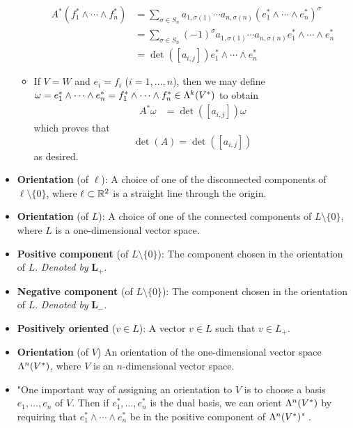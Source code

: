 \documentclass[../notes.tex]{subfiles}
\begin{document}
\begin{itemize}
\begin{itemize}
        \begin{align*}
            A^*(f_1^*\wedge\cdots\wedge f_n^*) &= \sum_{\sigma\in S_n}a_{1,\sigma(1)}\cdots a_{n,\sigma(n)}(e_1^*\wedge\cdots\wedge e_n^*)^\sigma\\
            &= \sum_{\sigma\in S_n}(-1)^\sigma a_{1,\sigma(1)}\cdots a_{n,\sigma(n)}e_1^*\wedge\cdots\wedge e_n^*\\
            &= \det([a_{i,j}])e_1^*\wedge\cdots\wedge e_n^*
        \end{align*}
        \item If $V=W$ and $e_i=f_i$ ($i=1,\dots,n$), then we may define $\omega=e_1^*\wedge\cdots\wedge e_n^*=f_1^*\wedge\cdots\wedge f_n^*\in\lam[k]{V^*}$ to obtain
        \begin{align*}
            A^*\omega &= \det([a_{i,j}])\omega
        \end{align*}
        which proves that
        \begin{equation*}
            \det(A) = \det([a_{i,j}])
        \end{equation*}
        as desired.
    \end{itemize}
    \item \textbf{Orientation} (of $\ell$): A choice of one of the disconnected components of $\ell\setminus\{0\}$, where $\ell\subset\R^2$ is a straight line through the origin.
    \item \textbf{Orientation} (of $L$): A choice of one of the connected components of $L\setminus\{0\}$, where $L$ is a one-dimensional vector space.
    \item \textbf{Positive component} (of $L\setminus\{0\}$): The component chosen in the orientation of $L$. \emph{Denoted by} $\bm{L_+}$.
    \item \textbf{Negative component} (of $L\setminus\{0\}$): The component chosen in the orientation of $L$. \emph{Denoted by} $\bm{L_-}$.
    \item \textbf{Positively oriented} ($v\in L$): A vector $v\in L$ such that $v\in L_+$.
    \item \textbf{Orientation} (of $V$) An orientation of the one-dimensional vector space $\lam[n]{V^*}$, where $V$ is an $n$-dimensional vector space.
    \item "One important way of assigning an orientation to $V$ is to choose a basis $e_1,\dots,e_n$ of $V$. Then if $e_1^*,\dots,e_n^*$ is the dual basis, we can orient $\lam[n]{V^*}$ by requiring that $e_1^*\wedge\cdots\wedge e_n^*$ be in the positive component of $\lam[n]{V^*}$" \parencite[29]{bib:DifferentialForms}.

\end{itemize}
\end{document}
